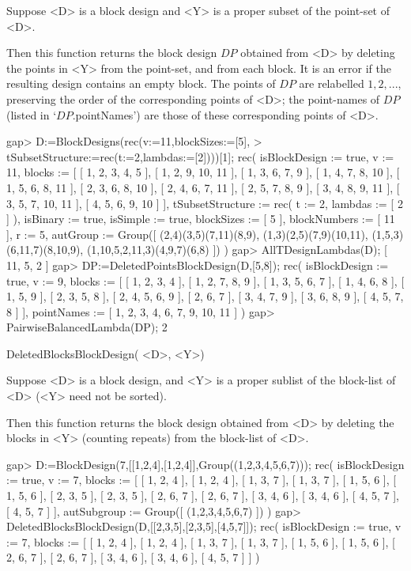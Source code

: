 Suppose <D> is a block design and <Y> is a proper subset of the point-set
of <D>.

Then this function returns the block design $DP$ obtained from <D> by
deleting the points in <Y> from the point-set, and from each block.
It is an error if the resulting design contains an empty block.
The points of $DP$ are relabelled $1,2,...$, preserving the order of
the corresponding points of <D>; the point-names of $DP$ (listed in
`$DP$.pointNames') are those of these corresponding points of <D>.


\beginexample
gap> D:=BlockDesigns(rec(v:=11,blockSizes:=[5],
>       tSubsetStructure:=rec(t:=2,lambdas:=[2])))[1];
rec( isBlockDesign := true, v := 11, 
  blocks := [ [ 1, 2, 3, 4, 5 ], [ 1, 2, 9, 10, 11 ], [ 1, 3, 6, 7, 9 ], 
      [ 1, 4, 7, 8, 10 ], [ 1, 5, 6, 8, 11 ], [ 2, 3, 6, 8, 10 ], 
      [ 2, 4, 6, 7, 11 ], [ 2, 5, 7, 8, 9 ], [ 3, 4, 8, 9, 11 ], 
      [ 3, 5, 7, 10, 11 ], [ 4, 5, 6, 9, 10 ] ], 
  tSubsetStructure := rec( t := 2, lambdas := [ 2 ] ), isBinary := true, 
  isSimple := true, blockSizes := [ 5 ], blockNumbers := [ 11 ], r := 5, 
  autGroup := Group([ (2,4)(3,5)(7,11)(8,9), (1,3)(2,5)(7,9)(10,11), 
      (1,5,3)(6,11,7)(8,10,9), (1,10,5,2,11,3)(4,9,7)(6,8) ]) )
gap> AllTDesignLambdas(D);      
[ 11, 5, 2 ]
gap> DP:=DeletedPointsBlockDesign(D,[5,8]);
rec( isBlockDesign := true, v := 9, 
  blocks := [ [ 1, 2, 3, 4 ], [ 1, 2, 7, 8, 9 ], [ 1, 3, 5, 6, 7 ], 
      [ 1, 4, 6, 8 ], [ 1, 5, 9 ], [ 2, 3, 5, 8 ], [ 2, 4, 5, 6, 9 ], 
      [ 2, 6, 7 ], [ 3, 4, 7, 9 ], [ 3, 6, 8, 9 ], [ 4, 5, 7, 8 ] ], 
  pointNames := [ 1, 2, 3, 4, 6, 7, 9, 10, 11 ] )
gap> PairwiseBalancedLambda(DP);
2
\endexample



\>DeletedBlocksBlockDesign( <D>, <Y>)

Suppose <D> is a block design, and <Y> is a proper sublist of the 
block-list of <D> (<Y> need not be sorted).
 
Then this function returns the block design obtained from <D> by deleting
the blocks in <Y> (counting repeats) from the block-list of <D>.

\beginexample
gap> D:=BlockDesign(7,[[1,2,4],[1,2,4]],Group((1,2,3,4,5,6,7)));
rec( isBlockDesign := true, v := 7, 
  blocks := [ [ 1, 2, 4 ], [ 1, 2, 4 ], [ 1, 3, 7 ], [ 1, 3, 7 ], 
      [ 1, 5, 6 ], [ 1, 5, 6 ], [ 2, 3, 5 ], [ 2, 3, 5 ], [ 2, 6, 7 ], 
      [ 2, 6, 7 ], [ 3, 4, 6 ], [ 3, 4, 6 ], [ 4, 5, 7 ], [ 4, 5, 7 ] ], 
  autSubgroup := Group([ (1,2,3,4,5,6,7) ]) )
gap> DeletedBlocksBlockDesign(D,[[2,3,5],[2,3,5],[4,5,7]]);
rec( isBlockDesign := true, v := 7, 
  blocks := [ [ 1, 2, 4 ], [ 1, 2, 4 ], [ 1, 3, 7 ], [ 1, 3, 7 ], 
      [ 1, 5, 6 ], [ 1, 5, 6 ], [ 2, 6, 7 ], [ 2, 6, 7 ], [ 3, 4, 6 ], 
      [ 3, 4, 6 ], [ 4, 5, 7 ] ] )
\endexample



